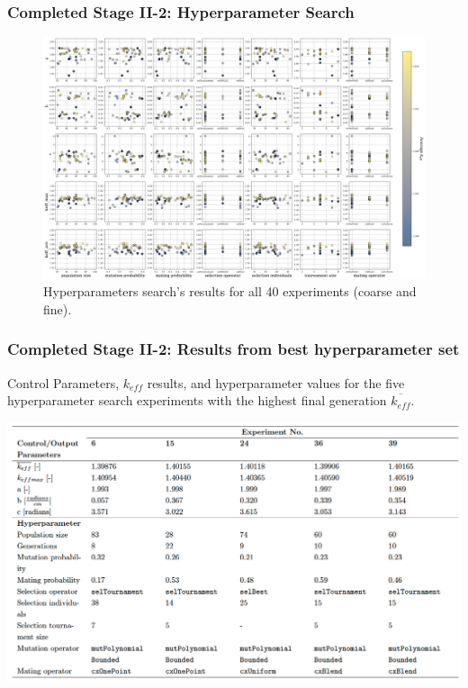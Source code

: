 \begin{frame}
    \frametitle{Completed Stage II-2: Hyperparameter Search}
    \begin{figure}[]
        \centering
        \includegraphics[width=0.85\linewidth]{../docs/figures/input_hyperparameters_sens.png} 
        \caption{Hyperparameters search's results for all 40 experiments (coarse 
        and fine).}
    \end{figure}
\end{frame}

\begin{frame}
    \frametitle{Completed Stage II-2: Results from best hyperparameter set}
    \begin{table}
        \caption{Control Parameters, $k_{eff}$ results, and hyperparameter values for 
        the five hyperparameter search experiments with the highest final generation 
        $\overline{k_{eff}}$.}
        \includegraphics[width=0.85\linewidth]{figures/rollo-demo-best.png} 
    \end{table}
\end{frame}

